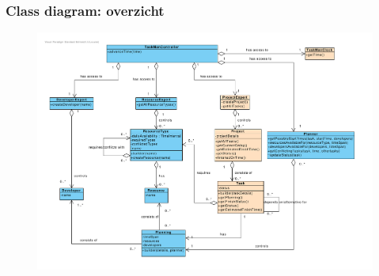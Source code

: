 \documentclass{beamer}
\begin{document}
\begin{frame}
\frametitle {Class diagram: overzicht}
\vspace{-1.4cm}
\begin{figure}
\centering
\begin{center}
\includegraphics[width=1.05\textwidth]{figures/Class_diagram_iteratie2.pdf}
\end{center}

\end{figure}
\end{frame}

%
%   
%
\end{document}
